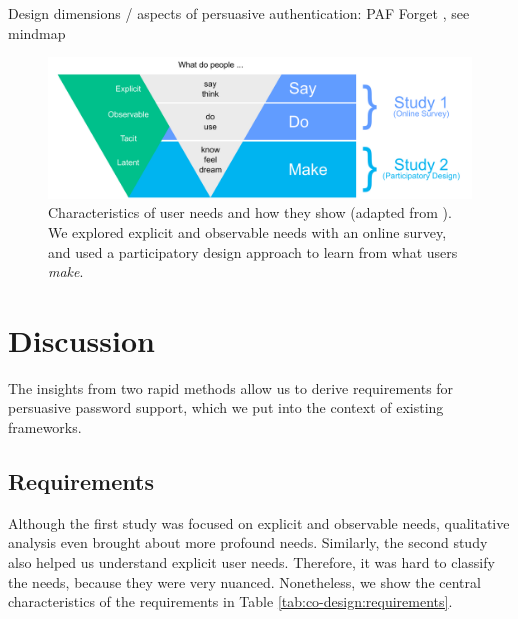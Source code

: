 Design dimensions / aspects of persuasive authentication: PAF Forget \etal \cite{Forget2007PersuasionEducationSecurity}, see mindmap

\begin{figure}
	\centering
	\includegraphics[width=\linewidth]{figures/co-design/exploration-overview}
	\caption{\label{fig:co-design:exploration-overview} Characteristics of user needs and how they show (adapted from  \cite{Sanders2002ParticipatoryDesign}). We explored explicit and observable needs with an online survey, and used a participatory design approach to learn from what users \textit{make}.}
\end{figure}



		
		


\section{Discussion}
The insights from two rapid methods allow us to derive requirements for persuasive password support, which we put into the context of existing frameworks. 

\subsection{Requirements}
Although the first study was focused on explicit and observable needs, qualitative analysis even brought about more profound needs. Similarly, the second study also helped us understand explicit user needs. Therefore, it was hard to classify the needs, because they were very nuanced. Nonetheless, we show the central characteristics of the requirements in Table \ref{tab:co-design:requirements}.


